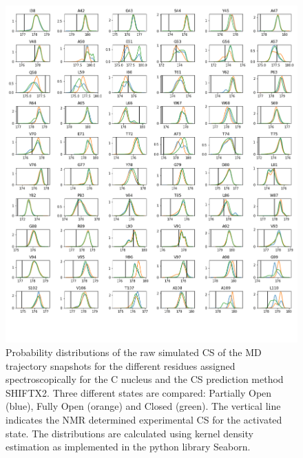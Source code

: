 \documentclass[%
 aip,
 amsmath,amssymb,
 preprint,%
]{revtex4-1}
\begin{document}
\begin{figure}[tbp]
	\includegraphics[width=\textwidth]{figures_SI/hist_sparta_plus_C.png}
	 \caption{\scriptsize
 Probability distributions of the raw simulated CS of the MD trajectory snapshots for the different residues assigned spectroscopically for the C nucleus and the CS prediction method SHIFTX2. Three different states are compared: Partially Open (blue), Fully Open (orange) and Closed (green). The vertical line indicates the NMR determined experimental CS for the activated state. The distributions are calculated using kernel density estimation as implemented in the python library Seaborn. 
}
\label{SI_hist7}
\end{figure}
\end{document}
